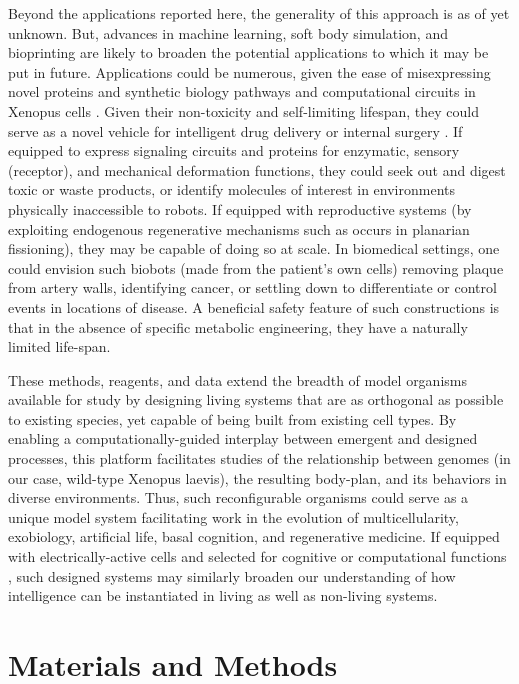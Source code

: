 Beyond the applications reported here, the generality of this approach is as of yet unknown. 
But, advances in machine learning, soft body simulation, and bioprinting are likely to broaden the potential applications to which it may be put in future. 
Applications could be numerous, given the ease of misexpressing novel proteins and synthetic biology pathways and computational circuits in Xenopus cells \cite{toda2018programming}. 
Given their non-toxicity and self-limiting lifespan, they could serve as a novel vehicle for intelligent drug delivery \cite{patra2013intelligent} or internal surgery \cite{li2017micro}. 
If equipped to express signaling circuits and proteins for enzymatic, sensory (receptor), and mechanical deformation functions, they could seek out and digest toxic or waste products, or identify molecules of interest in environments physically inaccessible to robots.
If equipped with reproductive systems (by exploiting endogenous regenerative mechanisms such as occurs in planarian fissioning), they may be capable of doing so at scale. 
In biomedical settings, one could envision such biobots (made from the patient's own cells) removing plaque from artery walls, identifying cancer, or settling down to differentiate or control events in locations of disease. 
A beneficial safety feature of such constructions is that in the absence of specific metabolic engineering, they have a naturally limited life-span. 

These methods, reagents, and data extend the breadth of model organisms available for study by designing living systems that are as orthogonal as possible to existing species, yet capable of being built from existing cell types. 
By enabling a computationally-guided interplay between emergent and designed processes, this platform facilitates studies of the relationship between genomes (in our case, wild-type Xenopus laevis), the resulting body-plan, and its behaviors in diverse environments. 
Thus, such reconfigurable organisms could serve as a unique model system facilitating work in the evolution of multicellularity, exobiology, artificial life, basal cognition, and regenerative medicine. 
If equipped with electrically-active cells and selected for cognitive or computational functions \cite{baluvska2016having}, such designed systems may similarly broaden our understanding of how intelligence can be instantiated in living as well as non-living systems.


\section{Materials and Methods}


